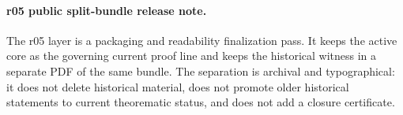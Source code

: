 \paragraph{r05 public split-bundle release note.}
The r05 layer is a packaging and readability finalization pass. It keeps the active core as the governing current proof line and keeps the historical witness in a separate PDF of the same bundle. The separation is archival and typographical: it does not delete historical material, does not promote older historical statements to current theorematic status, and does not add a closure certificate.

\clearpage
\tableofcontents
\clearpage

